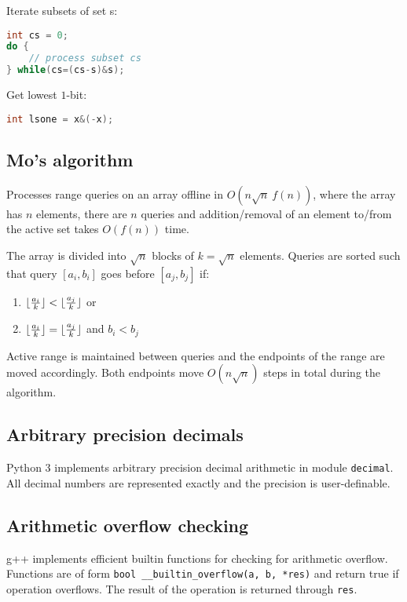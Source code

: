 \documentclass{article}
\DeclarePairedDelimiter\floor{\lfloor}{\rfloor} %
\begin{document}
Iterate subsets of set s:
\begin{lstlisting}[language=C++]
int cs = 0;
do {
	// process subset cs
} while(cs=(cs-s)&s);
\end{lstlisting}

Get lowest $1$-bit:
\begin{lstlisting}[language=C++]
int lsone = x&(-x);
\end{lstlisting}

\subsection{Mo's algorithm}

Processes range queries on an array offline in $O(n\sqrt{n} \ f(n))$, where the array has $n$ elements, there are $n$ queries and addition/removal of an element to/from the active set takes $O(f(n))$ time.

The array is divided into $\sqrt{n}$ blocks of $k = \sqrt{n}$ elements. Queries are sorted such that query $[a_i, b_i]$ goes before $[a_j, b_j]$ if:

\begin{enumerate}
	\item $\floor{\frac{a_i}{k}} < \floor{\frac{a_j}{k}}$ or
	\item $\floor{\frac{a_i}{k}} = \floor{\frac{a_j}{k}}$ and $b_i < b_j$
\end{enumerate}

Active range is maintained between queries and the endpoints of the range are moved accordingly. Both endpoints move $O(n\sqrt{n})$ steps in total during the algorithm.

\subsection {Arbitrary precision decimals}

Python 3 implements arbitrary precision decimal arithmetic in module \texttt{decimal}. All decimal numbers are represented exactly and the precision is user-definable.



\subsection {Arithmetic overflow checking}

g++ implements efficient builtin functions for checking for arithmetic overflow. Functions are of form \linebreak \verb|bool __builtin_overflow(a, b, *res)| and return true if operation overflows. The result of the operation is returned through \texttt{res}.
\end{document}
